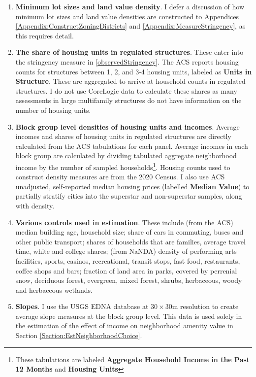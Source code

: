 \documentclass[12pt]{article}
\begin{document}
	\begin{enumerate}
		\item \textbf{Minimum lot sizes and land value density}. I defer a discussion of how minimum lot sizes and land value densities are constructed to Appendices \ref{Appendix:ConstructZoningDistricts} and \ref{Appendix:MeasureStringency}, as this requires detail.
		
		\item \textbf{The share of housing units in regulated structures}. These enter into the stringency measure in \eqref{observedStringency}. The ACS reports housing counts for structures between 1, 2, and 3-4 housing units, labeled as \textbf{Units in Structure}. These are aggregated to arrive at household counts in regulated structures. I do not use CoreLogic data to calculate these shares as many assessments in large multifamily structures do not have information on the number of housing units. 
		
		\item \textbf{Block group level densities of housing units and incomes}.  Average incomes and shares of housing units in regulated structures are directly calculated from the ACS tabulations for each panel. Average incomes in each block group are calculated by dividing tabulated aggregate neighborhood income by the number of sampled households\footnote{These tabulations are labeled \textbf{Aggregate Household Income in the Past 12 Months} and \textbf{Housing Units}}. Housing counts used to construct density measures are from the 2020 Census. I also use ACS unadjusted, self-reported median housing prices (labelled \textbf{Median Value}) to partially stratify cities into the superstar and non-superstar samples, along with density. 
		
		\item \textbf{Various controls used in estimation}. These include (from the ACS) median building age, household size; share of cars in commuting, buses and other public transport; shares of households that are families, average travel time, white and college shares; (from NaNDA) density of performing arts facilities, sports, casinos, recreational, transit stops, fast food, restaurants, coffee shops and bars; fraction of land area in parks, covered by perrenial snow, deciduous forest, evergreen, mixed forest, shrubs, herbaceous, woody and herbaceous wetlands. 
		
		\item \textbf{Slopes}. I use the USGS EDNA database at $30 \times 30$m resolution to create average slope measures at the block group level. This data is used solely in the estimation of the effect of income on neighborhood amenity value in Section \ref{Section:EstNeighborhoodChoice}. 
	\end{enumerate}
	
\end{document}
